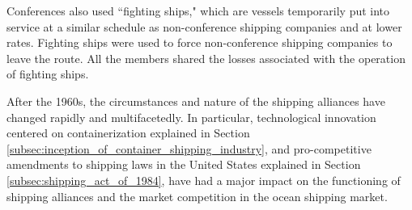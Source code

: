\documentclass[11pt]{article}
\begin{document}

Conferences also used ``fighting ships," which are vessels temporarily put into service at a similar schedule as non-conference shipping companies and at lower rates. Fighting ships were used to force non-conference shipping companies to leave the route. All the members shared the losses associated with the operation of fighting ships.


After the 1960s, the circumstances and nature of the shipping alliances have changed rapidly and multifacetedly. In particular, technological innovation centered on containerization explained in Section \ref{subsec:inception_of_container_shipping_industry},  and pro-competitive amendments to shipping laws in the United States explained in Section \ref{subsec:shipping_act_of_1984}, have had a major impact on the functioning of shipping alliances and the market competition in the ocean shipping market.



\end{document}
